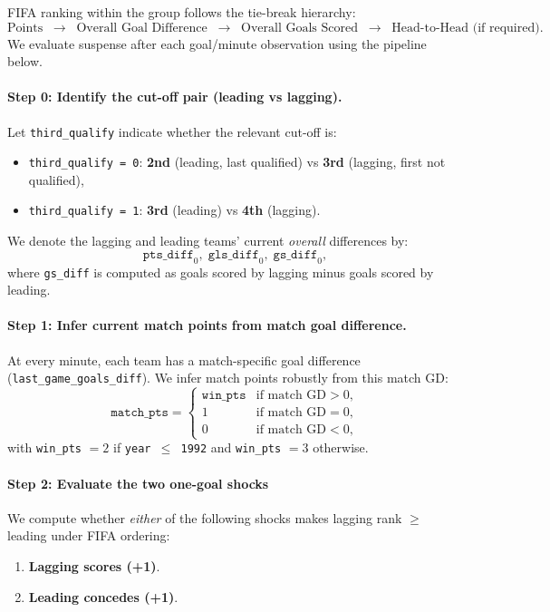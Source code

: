 \documentclass[11pt]{article}
\begin{document}
FIFA ranking within the group follows the tie-break hierarchy:
\[
\text{Points} \;\; \rightarrow \;\; \text{Overall Goal Difference} \;\; \rightarrow \;\; \text{Overall Goals Scored} \;\; \rightarrow \;\; \text{Head-to-Head (if required)}.
\]
We evaluate suspense after each goal/minute observation using the pipeline below.

\paragraph{Step 0: Identify the cut-off pair (leading vs lagging).}
Let \texttt{third\_qualify} indicate whether the relevant cut-off is:
\begin{itemize}
    \item \texttt{third\_qualify = 0}: \textbf{2nd} (leading, last qualified) vs \textbf{3rd} (lagging, first not qualified),
    \item \texttt{third\_qualify = 1}: \textbf{3rd} (leading) vs \textbf{4th} (lagging).
\end{itemize}
We denote the lagging and leading teams' current \emph{overall} differences by:
\[
\texttt{pts\_diff}_0,\;\texttt{gls\_diff}_0,\;\texttt{gs\_diff}_0,
\]
where \texttt{gs\_diff} is computed as goals scored by lagging minus goals scored by leading.

\paragraph{Step 1: Infer current match points from match goal difference.}
At every minute, each team has a match-specific goal difference (\texttt{last\_game\_goals\_diff}).
We infer match points robustly from this match GD:
\[
\texttt{match\_pts} =
\begin{cases}
\texttt{win\_pts} & \text{if match GD} > 0,\\
1 & \text{if match GD} = 0,\\
0 & \text{if match GD} < 0,
\end{cases}
\]
with \texttt{win\_pts} $=2$ if \texttt{year $\le$ 1992} and \texttt{win\_pts} $=3$ otherwise.

\paragraph{Step 2: Evaluate the two one-goal shocks }

We compute whether \emph{either} of the following shocks makes lagging rank $\ge$ leading under FIFA ordering:
\begin{enumerate}
    \item \textbf{Lagging scores (+1)}.
    \item \textbf{Leading concedes (+1)}.
\end{enumerate}
\end{document}
